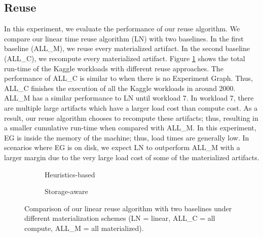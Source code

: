\subsection{Reuse}
In this experiment, we evaluate the performance of our reuse algorithm.
We compare our linear time reuse algorithm (LN) with two baselines.
In the first baseline (ALL\_M), we reuse every materialized artifact.
In the second baseline (ALL\_C), we recompute every materialized artifact.
Figure \ref{reuse-experiment} shows the total run-time of the Kaggle workloads with different reuse approaches.
The performance of ALL\_C is similar to when there is no Experiment Graph.
Thus, ALL\_C finishes the execution of all the Kaggle workloads in around 2000.
ALL\_M has a similar performance to LN until workload 7.
In workload 7, there are multiple large artifacts which have a larger load cost than compute cost.
As a result, our reuse algorithm chooses to recompute these artifacts; thus, resulting in a smaller cumulative run-time when compared with ALL\_M.
In this experiment, EG is inside the memory of the machine; thus, load times are generally low.
In scenarios where EG is on disk, we expect LN to outperform ALL\_M with a larger margin due to the very large load cost of some of the materialized artifacts.
\begin{figure}
\begin{subfigure}[b]{0.5\linewidth}
\centering
 \resizebox{\columnwidth}{!}{%
%
}
\caption{Heuristics-based}
\end{subfigure}%
\begin{subfigure}[b]{0.5\linewidth}
\centering
 \resizebox{\columnwidth}{!}{%
%
}

\caption{Storage-aware}
\end{subfigure}
\caption{Comparison of our linear reuse algorithm with two baselines under different materialization schemes (LN = linear, ALL\_C = all compute, ALL\_M = all materialized).}
\label{reuse-experiment}
\end{figure}

